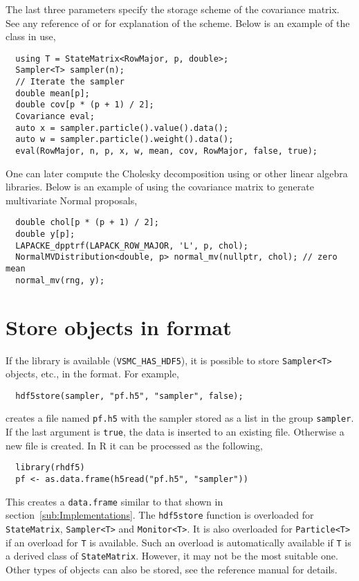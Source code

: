 The last three parameters specify the storage scheme of the covariance matrix.
See any reference of \blas or \lapack for explanation of the scheme. Below is
an example of the class in use,
\begin{Verbatim}
  using T = StateMatrix<RowMajor, p, double>;
  Sampler<T> sampler(n);
  // Iterate the sampler
  double mean[p];
  double cov[p * (p + 1) / 2];
  Covariance eval;
  auto x = sampler.particle().value().data();
  auto w = sampler.particle().weight().data();
  eval(RowMajor, n, p, x, w, mean, cov, RowMajor, false, true);
\end{Verbatim}
One can later compute the Cholesky decomposition using \lapack or other linear
algebra libraries. Below is an example of using the covariance matrix to
generate multivariate Normal proposals,
\begin{Verbatim}
  double chol[p * (p + 1) / 2];
  double y[p];
  LAPACKE_dpptrf(LAPACK_ROW_MAJOR, 'L', p, chol);
  NormalMVDistribution<double, p> normal_mv(nullptr, chol); // zero mean
  normal_mv(rng, y);
\end{Verbatim}

\section{Store objects in \protect\hdf format}
\label{sec:Store objects in HDF5 format}

If the \hdf library is available (\verb|VSMC_HAS_HDF5|), it is possible to
store \verb|Sampler<T>| objects, etc., in the \hdf format. For example,
\begin{Verbatim}
  hdf5store(sampler, "pf.h5", "sampler", false);
\end{Verbatim}
creates a \hdf file named \verb|pf.h5| with the sampler stored as a list in the
group \verb|sampler|. If the last argument is \verb|true|, the data is inserted
to an existing file. Otherwise a new file is created. In R it can be processed
as the following,
\begin{Verbatim}
  library(rhdf5)
  pf <- as.data.frame(h5read("pf.h5", "sampler"))
\end{Verbatim}
This creates a \verb|data.frame| similar to that shown in
section~\ref{sub:Implementations}. The \verb|hdf5store| function is overloaded
for \verb|StateMatrix|, \verb|Sampler<T>| and \verb|Monitor<T>|. It is also
overloaded for \verb|Particle<T>| if an overload for \verb|T| is available.
Such an overload is automatically available if \verb|T| is a derived class of
\verb|StateMatrix|. However, it may not be the most suitable one. Other types
of objects can also be stored, see the reference manual for details.

